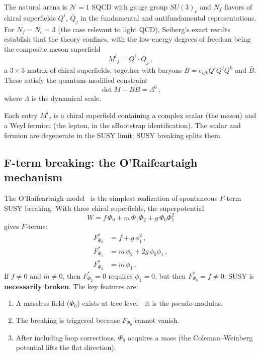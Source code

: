 \documentclass[12pt,a4paper]{article}
\begin{document}
The natural arena is $\mathcal{N}=1$ SQCD with gauge group $SU(3)_c$
and $N_f$ flavors of chiral superfields $Q^i$, $\bar{Q}_j$ in the
fundamental and antifundamental representations. For $N_f = N_c = 3$
(the case relevant to light QCD), Seiberg's exact results
\cite{Seiberg1995} establish that the theory confines, with the
low-energy degrees of freedom being the composite meson superfield
\begin{equation}
M^i{}_j = Q^i \cdot \bar{Q}_j\,,
\end{equation}
a $3\times 3$ matrix of chiral superfields, together with baryons
$B = \epsilon_{ijk}Q^iQ^jQ^k$ and $\bar{B}$. These satisfy the
quantum-modified constraint
\begin{equation}
\det M - B\bar{B} = \Lambda^{6}\,,
\end{equation}
where $\Lambda$ is the dynamical scale.

Each entry $M^i{}_j$ is a chiral superfield containing a complex
scalar (the meson) and a Weyl fermion (the lepton, in the sBootstrap
identification). The scalar and fermion are degenerate in the SUSY
limit; SUSY breaking splits them.

\subsection{F-term breaking: the O'Raifeartaigh mechanism}

The O'Raifeartaigh model~\cite{ORaifeartaigh} is the simplest
realization of spontaneous $F$-term SUSY breaking. With three chiral
superfields, the superpotential
\begin{equation}
W = f\,\Phi_0 + m\,\Phi_1\Phi_2 + g\,\Phi_0\Phi_1^2
\end{equation}
gives $F$-terms:
\begin{align}
F_{\Phi_0}^* &= f + g\,\phi_1^2\,, \\
F_{\Phi_1}^* &= m\,\phi_2 + 2g\,\phi_0\phi_1\,, \\
F_{\Phi_2}^* &= m\,\phi_1\,.
\end{align}
If $f \neq 0$ and $m \neq 0$, then $F_{\Phi_2}^* = 0$ requires
$\phi_1 = 0$, but then $F_{\Phi_0}^* = f \neq 0$: SUSY is
\textbf{necessarily broken}. The key features are:
\begin{enumerate}
\item A massless field ($\Phi_0$) exists at tree level---it is the
pseudo-modulus.
\item The breaking is triggered because $F_{\Phi_0}$ cannot vanish.
\item After including loop corrections, $\Phi_0$ acquires a mass
(the Coleman--Weinberg potential lifts the flat direction).
\end{enumerate}
\end{document}
